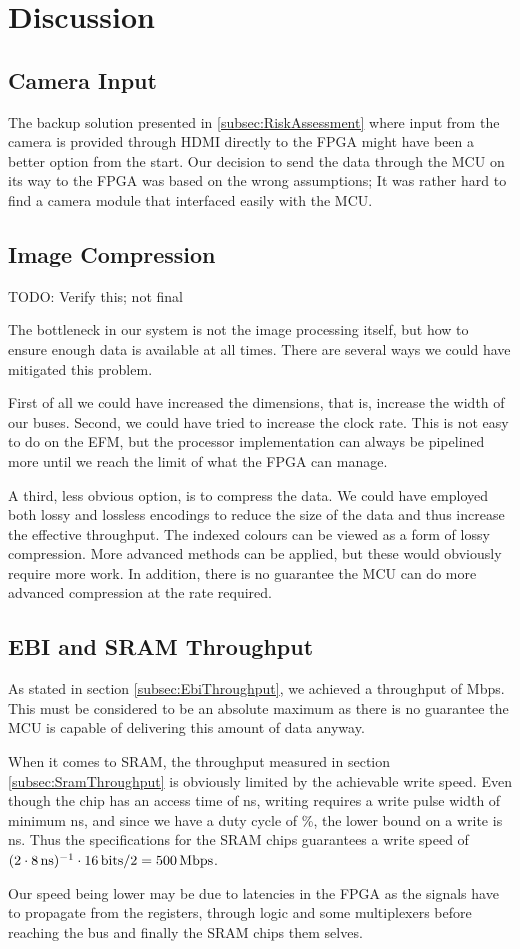 \section{Discussion}

\subsection{Camera Input}
The backup solution presented in \ref{subsec:RiskAssessment} where input from the camera is provided through HDMI directly to the FPGA might have been a better option from the start.
Our decision to send the data through the MCU on its way to the FPGA was based on the wrong assumptions; It was rather hard to find a camera module that interfaced easily with the MCU.


\subsection{Image Compression}
TODO: Verify this; not final

The bottleneck in our system is not the image processing itself, but how to ensure enough data is available at all times.
There are several ways we could have mitigated this problem.

First of all we could have increased the dimensions, that is, increase the width of our buses. Second, we could have tried to increase the clock rate. This is not easy to do on the EFM, but the processor implementation can always be pipelined more until we reach the limit of what the FPGA can manage.

A third, less obvious option, is to compress the data. We could have employed both lossy and lossless encodings to reduce the size of the data and thus increase the effective throughput. The indexed colours can be viewed as a form of lossy compression.
More advanced methods can be applied, but these would obviously require more work.
In addition, there is no guarantee the MCU can do more advanced compression at the rate required.

\subsection{EBI and SRAM Throughput}
As stated in section \ref{subsec:EbiThroughput}, we achieved a throughput of \unit[384]{Mbps}.
This must be considered to be an absolute maximum as there is no guarantee the MCU is capable of delivering this amount of data anyway.

When it comes to SRAM, the throughput measured in section \ref{subsec:SramThroughput} is obviously limited by the achievable write speed.
Even though the chip has an access time of \unit[10]{ns}, writing requires a write pulse width of minimum \unit[8]{ns}, and since we have a duty cycle of \unit[50]{\%}, the lower bound on a write is \unit[16]{ns}.
Thus the specifications for the SRAM chips guarantees a write speed of $(2\cdot\unit[8]{ns})^{-1} \cdot \unit[16]{bits} / 2 = \unit[500]{Mbps}$.

Our speed being lower may be due to latencies in the FPGA as the signals have to propagate from the registers, through logic and some multiplexers before reaching the bus and finally the SRAM chips them selves.
